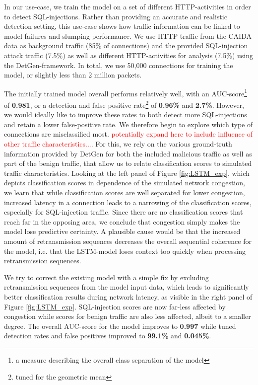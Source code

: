 \documentclass[sigconf]{acmart}
\begin{document}
In our use-case, we train the model on a set of different HTTP-activities in order to detect SQL-injections. Rather than providing an accurate and realistic detection setting, this use-case shows how traffic information can be linked to model failures and slumping performance. We use HTTP-traffic from the CAIDA data as background traffic (85\% of connections) and the provided SQL-injection attack traffic (7.5\%) as well as different HTTP-activities for analysis (7.5\%) using the DetGen-framework. In total, we use 50,000 connections for training the model, or slightly less than 2 million packets. 

The initially trained model overall performs relatively well, with an AUC-score\footnote{a measure describing the overall class separation of the model} of \textbf{0.981}, or a detection and false positive rate\footnote{tuned for the geometric mean} of \textbf{0.96\%} and \textbf{2.7\%}. However, we would ideally like to improve these rates to both detect more SQL-injections and retain a lower false-positive rate. We therefore begin to explore which type of connections are misclassified most. \textcolor{red}{potentially expand here to include influence of other traffic characteristics...}. For this, we rely on the various ground-truth information provided by DetGen for both the included malicious traffic as well as part of the benign traffic, that allow us to relate classification scores to simulated traffic characteristics. Looking at the left panel of Figure \ref{fig:LSTM_exp}, which depicts classification scores in dependence of the simulated network congestion, we learn that while classification scores are well separated for lower congestion, increased latency in a connection leads to a narrowing of the classification scores, especially for SQL-injection traffic. Since there are no classification scores that reach far in the opposing area, we conclude that congestion simply makes the model lose predictive certainty. A plausible cause would be that the increased amount of retransmission sequences decreases the overall sequential coherence for the model, i.e. that the LSTM-model loses context too quickly when processing retransmission sequences. 

We try to correct the existing model with a simple fix by excluding retransmission sequences from the model input data, which leads to significantly better classification results during network latency, as visible in the right panel of Figure \ref{fig:LSTM_exp}. SQL-injection scores are now far-less affected by congestion while scores for benign traffic are also less affected, albeit to a smaller degree.
The overall AUC-score for the model improves to \textbf{0.997} while tuned detection rates and false positives improved to \textbf{99.1\%} and \textbf{0.045\%}.
\end{document}
